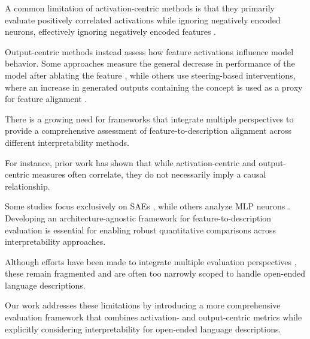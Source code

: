 A common limitation of activation-centric methods is that they primarily evaluate positively correlated activations while ignoring negatively encoded neurons, effectively ignoring negatively encoded features \cite{huang-etal-2023-rigorously, DBLP:conf/nips/KopfBHLHB24}.

Output-centric methods instead assess how feature activations influence model behavior. Some approaches measure the general decrease in performance of the model after ablating the feature \cite{bills2023language, makelov2024principledevaluationssparseautoencoders}, while others use steering-based interventions, where an increase in generated outputs containing the concept is used as a proxy for feature alignment \cite{paulo2024automaticallyinterpretingmillionsfeatures, gurarieh2025enhancingautomatedinterpretabilityoutputcentric}.

There is a growing need for frameworks that integrate multiple perspectives to provide a comprehensive assessment of feature-to-description alignment across different interpretability methods.

For instance, prior work \cite{bills2023language, menon2025analyzinginabilitiessaesformal, gurarieh2025enhancingautomatedinterpretabilityoutputcentric} has shown that while activation-centric and output-centric measures often correlate, they do not necessarily imply a causal relationship.
 
Some studies focus exclusively on SAEs \cite{goodfire, paulo2024automaticallyinterpretingmillionsfeatures}, while others analyze MLP neurons \cite{bills2023language, choi2024automatic}. Developing an architecture-agnostic framework for feature-to-description evaluation is essential for enabling robust quantitative comparisons across interpretability approaches.

Although efforts have been made to integrate multiple evaluation perspectives \cite{paulo2024automaticallyinterpretingmillionsfeatures, gurarieh2025enhancingautomatedinterpretabilityoutputcentric}, these remain fragmented and are often too narrowly scoped to handle open-ended language descriptions.

Our work addresses these limitations by introducing a more comprehensive evaluation framework that combines activation- and output-centric metrics while explicitly considering interpretability for open-ended language descriptions.